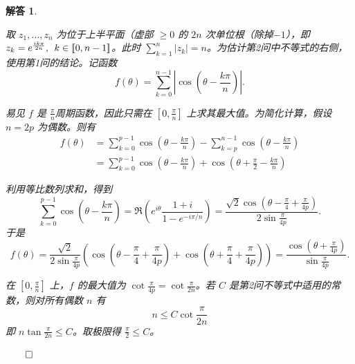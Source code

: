 \documentclass[12pt,UTF8,fontset=none]{ctexbook}
\theoremstyle{exercisestyle}
\theoremstyle{solutionstyle}
\newtheorem*{solution*}{解答}
\newenvironment{solution}
  {\begin{solution*}}
  {\hfill\ensuremath{\qed}\end{solution*}}
\begin{document}
\begin{solution}
\begin{subquestions}
\item 取 \( z_1, \ldots, z_n \) 为位于上半平面（虚部 \(\geqslant 0\) 的 \(2n\) 次单位根（除掉$-1$），即 \( z_k = e^{\frac{ik\pi}{2n}},\;\, k \in [\![0,n-1]\!] \)。此时 \( \sum_{k=1}^{n} |z_k| = n \)。为估计第2问中不等式的右侧，使用第1问的结论。记函数
\[
f(\theta) = \sum_{k=0}^{n-1} \left| \cos \left( \theta - \frac{k\pi}{n} \right) \right|.
\]

易见 \( f \) 是 \( \displaystyle\frac{\pi}{n} \)\dash 周期函数，因此只需在 \(\displaystyle\left[0, \frac{\pi}{n}\right]\) 上求其最大值。为简化计算，假设 \( n = 2p \) 为偶数。则有
\begin{align*}
f(\theta) &= \sum_{k=0}^{p-1} \cos\left(\theta - \frac{k\pi}{n}\right) - \sum_{k=p}^{n-1} \cos\left(\theta - \frac{k\pi}{n}\right) \\
&= \sum_{k=0}^{p-1} \cos\left(\theta - \frac{k\pi}{n}\right) + \cos\left(\theta + \frac{\pi}{2} - \frac{k\pi}{n}\right)
\end{align*}

利用等比数列求和，得到
\[
\sum_{k=0}^{p-1} \cos\left(\theta - \frac{k\pi}{n}\right) = \Re\left(e^{i\theta} \frac{1+i}{1 - e^{-i\pi/n}}\right) = \frac{\sqrt{2}\cos\left(\theta - \frac{\pi}{4} + \frac{\pi}{4p}\right)}{2\sin\frac{\pi}{4p}}.
\]
于是
\[
f(\theta) = \frac{\sqrt{2}}{2\sin\frac{\pi}{4p}} \left( \cos\left(\theta - \frac{\pi}{4} + \frac{\pi}{4p}\right) + \cos\left(\theta + \frac{\pi}{4} + \frac{\pi}{4p}\right) \right) = \frac{\cos(\theta + \frac{\pi}{4p})}{\sin\frac{\pi}{4p}}.
\]

在 \(\left[0, \frac{\pi}{n}\right]\) 上，\( f \) 的最大值为 \(\cot \frac{\pi}{4p} = \cot \frac{\pi}{2n}\)。若 \( C \) 是第2问不等式中适用的常数，则对所有偶数 \( n \) 有
\[
n \leqslant C \cot \frac{\pi}{2n}
\]
即 \( n \tan \frac{\pi}{2n} \leqslant C \)。取极限得 \( \frac{\pi}{2} \leqslant C \)。
\end{subquestions}

\end{solution}
\end{document}
